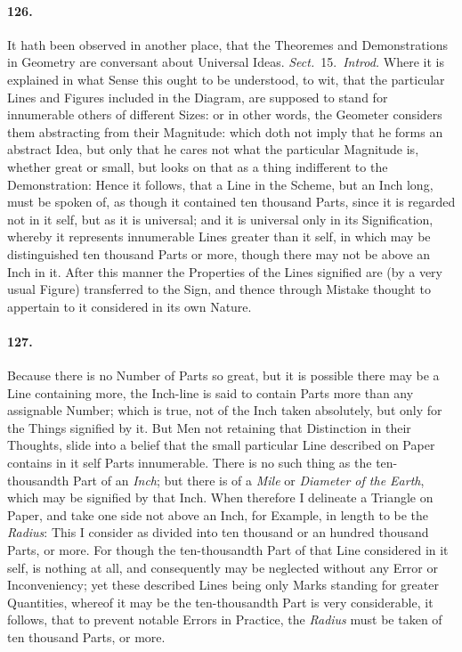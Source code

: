 \documentclass[]{article}
\newenvironment{sectionbody}{\begin{multicols}{2}}{\end{multicols}}
\begin{document}
\begin{sectionbody}
\paragraph{126.} It hath been observed in another place, that the Theoremes and
Demonstrations in Geometry are conversant about Universal Ideas.
\emph{Sect.}~15.\ \emph{Introd.}
Where it is explained in what Sense this ought to be understood,
to wit, that the particular Lines and Figures included in the
Diagram, are supposed to stand for innumerable others of
different Sizes: or in other words, the Geometer considers them
abstracting from their Magnitude: which doth not imply that he
forms an abstract Idea, but only that he cares not what the
particular Magnitude is, whether great or small, but looks on
that as a thing indifferent to the Demonstration: Hence it
follows, that a Line in the Scheme, but an Inch long, must be
spoken of, as though it contained ten thousand Parts, since it is
regarded not in it self, but as it is universal; and it is
universal only in its Signification, whereby it represents
innumerable Lines greater than it self, in which may be
distinguished ten thousand Parts or more, though there may not be
above an Inch in it.  After this manner the Properties of the
Lines signified are (by a very usual Figure) transferred to the
Sign, and thence through Mistake thought to appertain to it
considered in its own Nature.



\paragraph{127.} Because there is no Number of Parts so great, but it is possible
there may be a Line containing more, the Inch-line is said to
contain Parts more than any assignable Number; which is true, not
of the Inch taken absolutely, but only for the Things signified
by it.  But Men not retaining that Distinction in their Thoughts,
slide into a belief that the small particular Line described on
Paper contains in it self Parts innumerable.  There is no such
thing as the ten-thousandth Part of an \emph{Inch}; but there
is of a \emph{Mile} or \emph{Diameter of the Earth}, which
may be signified by that Inch.  When therefore I delineate a
Triangle on Paper, and take one side not above an Inch, for
Example, in length to be the \emph{Radius}: This I consider as
divided into ten thousand or an hundred thousand Parts, or more.
For though the ten-thousandth Part of that Line considered in it
self, is nothing at all, and consequently may be neglected
without any Error or Inconveniency; yet these described Lines
being only Marks standing for greater Quantities, whereof it may
be the ten-thousandth Part is very considerable, it follows, that
to prevent notable Errors in Practice, the \emph{Radius} must
be taken of ten thousand Parts, or more.




\end{sectionbody}
\end{document}
